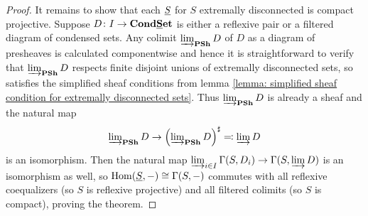 \begin{proof}
	
	It remains to show that each $\underline{S}$ for $S$ extremally disconnected is compact projective. Suppose $D\colon I\to {{{\mathbf{Cond}}}{{\mathbf{\underline{S}et}}}}$ is either a reflexive pair or a filtered diagram of condensed sets. Any colimit $\varinjlim_{{\mathbf{PSh}}} D$ of $D$ as a diagram of presheaves is calculated componentwise and hence it is straightforward to verify that $\varinjlim_{{\mathbf{PSh}}} D$ respects finite disjoint unions of extremally disconnected sets, so satisfies the simplified sheaf conditions from lemma \ref{lemma: simplified sheaf condition for extremally disconnected sets}. Thus $\varinjlim_{{\mathbf{PSh}}} D$ is already a sheaf and the natural map
	$$\colimit\nolimits_\preSheavesSymbol D \to \sheafification{\colimit\nolimits_\preSheavesSymbol D}\rdef \colimit D$$
	is an isomorphism. Then the natural map $\varinjlim_{i\in I} \Gamma(S, D_i)\to\Gamma(S, \varinjlim D)$ is an isomorphism as well, so ${\operatorname{Hom}}(\underline{S}, -)\cong \Gamma(S, -)$ commutes with all reflexive coequalizers (so $S$ is reflexive projective) and all filtered colimits (so $S$ is compact), proving the theorem.
\end{proof}

